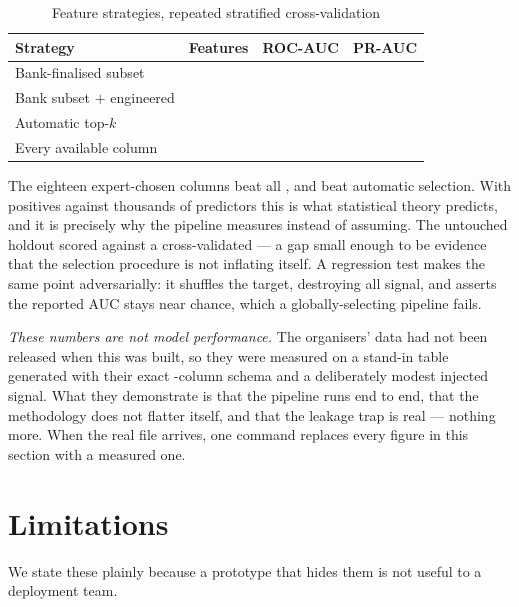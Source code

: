 \documentclass{article}
\begin{document}
\begin{table}[t]
\caption{Feature strategies, repeated stratified cross-validation}
\label{tab:boi}
\centering\small
\begin{tabular}{lrrr}
\hline
Strategy & Features & ROC-AUC & PR-AUC \\
\hline
Bank-finalised subset      & \boiBankN{}    & \boiBankAuc{}    & \boiBankPr{} \\
Bank subset $+$ engineered & \boiBankEngN{} & \boiBankEngAuc{} & \boiBankEngPr{} \\
Automatic top-$k$          & \boiTopKN{}    & \boiTopKAuc{}    & \boiTopKPr{} \\
Every available column     & \boiAllN{}     & \boiAllAuc{}     & \boiAllPr{} \\
\hline
\end{tabular}
\end{table}

The eighteen expert-chosen columns beat all \boiAllN{}, and beat automatic
selection. With \boiPositives{} positives against thousands of predictors this is
what statistical theory predicts, and it is precisely why the pipeline measures
instead of assuming. The untouched holdout scored \boiHoldoutAuc{} against a
cross-validated \boiCvAuc{} --- a gap small enough to be evidence that the
selection procedure is not inflating itself. A regression test makes the same
point adversarially: it shuffles the target, destroying all signal, and asserts
the reported AUC stays near chance, which a globally-selecting pipeline fails.

\emph{These numbers are not model performance.} The organisers' data had not been
released when this was built, so they were measured on a stand-in table generated
with their exact \boiColumns{}-column schema and a deliberately modest injected
signal. What they demonstrate is that the pipeline runs end to end, that the
methodology does not flatter itself, and that the leakage trap is real --- nothing
more. When the real file arrives, one command replaces every figure in this
section with a measured one.

\section{Limitations}
\label{sec:limits}

We state these plainly because a prototype that hides them is not useful to a
deployment team.
\end{document}
